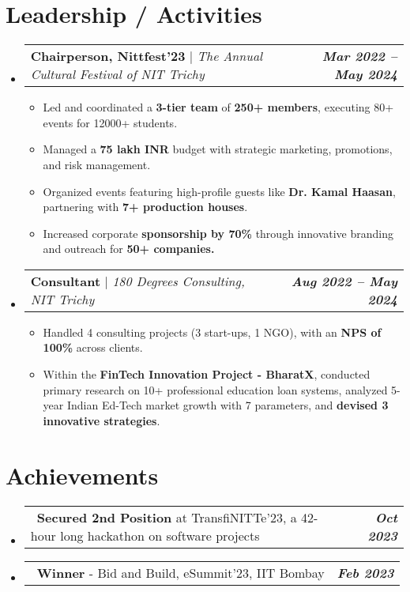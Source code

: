 \documentclass[letterpaper,11pt]{article}
\makeatletter
\newcommand{\resumeProjectHeading}[2]{
    \item
    \begin{tabular*}{0.97\textwidth}{l@{\extracolsep{\fill}}r}
      \small#1 & \textit{\textbf{\small#2}} \\
    \end{tabular*}\vspace{-7pt}
}
\newcommand{\achievement}[2]{
    \item
    \begin{tabular*}{0.97\textwidth}{l@{\extracolsep{\fill}}r}
      {\small \textbullet\ #1} & \textit{\textbf{\small#2}} \\
    \end{tabular*}\vspace{-7pt}
}
\newcommand{\resumeItem}[1]{
  \item\small{
    {#1 \vspace{-2pt}}
  }
}
\newcommand{\resumeSubHeadingListStart}{\begin{itemize}[leftmargin=0.15in, label={}]}
\newcommand{\resumeSubHeadingListEnd}{\end{itemize}}
\newcommand{\resumeItemListStart}{\begin{itemize}}
\newcommand{\resumeItemListEnd}{\end{itemize}\vspace{-5pt}}
\makeatother
\begin{document}
\section{Leadership / Activities}
    \resumeSubHeadingListStart
      \resumeProjectHeading
          {\textbf{Chairperson, Nittfest’23} $|$ \emph{The Annual Cultural Festival of NIT Trichy}}{Mar 2022 -- May 2024}
          \resumeItemListStart
            \resumeItem{Led and coordinated a \textbf{3-tier team} of \textbf{250+ members}, executing 80+ events for 12000+ students.}
            \resumeItem{Managed a \textbf{75 lakh INR }budget with strategic marketing, promotions, and risk management.}
            \resumeItem{Organized events featuring high-profile guests like \textbf{Dr. Kamal Haasan}, partnering with \textbf{7+ production houses}.}
            \resumeItem{Increased corporate \textbf{sponsorship by 70\%} through innovative branding and outreach for \textbf{50+ companies.}}
          \resumeItemListEnd

      \resumeProjectHeading
          {\textbf{Consultant} $|$ \emph{180 Degrees Consulting, NIT Trichy}}{Aug 2022 -- May 2024}
          \resumeItemListStart
            \resumeItem{Handled 4 consulting projects (3 start-ups, 1 NGO), with an \textbf{NPS of 100\%} across clients.}
            \resumeItem{Within the \textbf{FinTech Innovation Project - BharatX}, conducted primary research on 10+ professional education loan systems, analyzed 5-year Indian Ed-Tech market growth with 7 parameters, and \textbf{devised 3 innovative strategies}.}
          \resumeItemListEnd
    \resumeSubHeadingListEnd


\section{Achievements}
    \resumeSubHeadingListStart
        \achievement
        {\textbf{Secured 2nd Position} at TransfiNITTe'23, a 42-hour long hackathon on software projects}{Oct 2023}
        
        \achievement
        {\textbf{Winner} - Bid and Build, eSummit’23, IIT Bombay}{Feb 2023}
    \resumeSubHeadingListEnd


\end{document}
